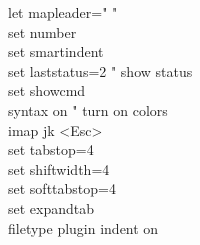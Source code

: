 let mapleader=" "\\
set number\\
set smartindent\\
set laststatus=2            " show status\\
set showcmd\\
syntax on                   " turn on colors\\
imap jk         <Esc>\\
set tabstop=4\\
set shiftwidth=4\\
set softtabstop=4\\
set expandtab\\
filetype plugin indent on\\

